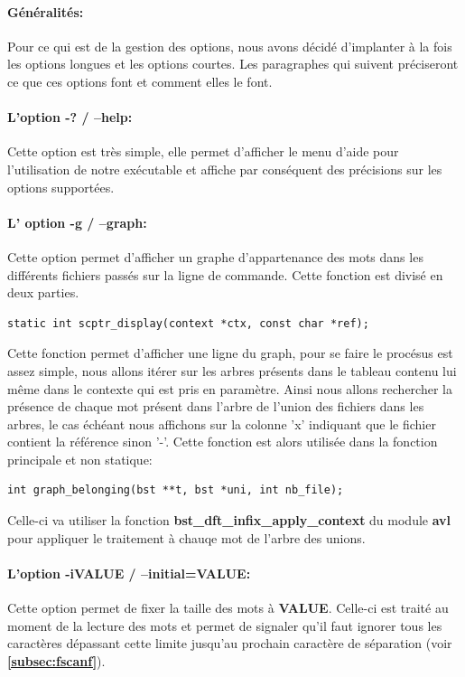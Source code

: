\documentclass{article}
\begin{document}
\paragraph{Généralités:}
Pour ce qui est de la gestion des options, nous avons décidé d'implanter à la fois les options longues et les options courtes.
Les paragraphes qui suivent préciseront ce que ces options font et comment elles le font.

\paragraph{L'option -? / --help:}
Cette option est très simple, elle permet d'afficher le menu d'aide pour l'utilisation 
de notre exécutable et affiche par conséquent des précisions sur les options supportées.

\paragraph{L' option -g / --graph:}
Cette option permet d'afficher un graphe d'appartenance des mots dans les différents 
fichiers passés sur la ligne de commande. Cette fonction est divisé en deux parties.

\begin{lstlisting}[style=Cstyle]
  static int scptr_display(context *ctx, const char *ref); 
\end{lstlisting}
Cette fonction permet d'afficher une ligne du graph, pour se faire le procésus est assez simple,
nous allons itérer sur les arbres présents dans le tableau contenu lui même dans le contexte qui est pris en paramètre.
Ainsi nous allons rechercher la présence de chaque mot présent dans l'arbre de l'union des fichiers dans les arbres, 
le cas échéant nous affichons sur la colonne 'x' indiquant que le fichier contient la référence sinon '-'.
Cette fonction est alors utilisée dans la fonction principale et non statique:
\begin{lstlisting}[style=Cstyle]
  int graph_belonging(bst **t, bst *uni, int nb_file); 
\end{lstlisting}
Celle-ci va utiliser la fonction \textbf{bst\_dft\_infix\_apply\_context} du module \textbf{avl} pour appliquer le traitement
à chauqe mot de l'arbre des unions.

\paragraph{L'option -iVALUE / --initial=VALUE:}
Cette option permet de fixer la taille des mots à \textbf{VALUE}.
Celle-ci est traité au moment de la lecture des mots et permet de signaler qu'il faut ignorer tous les caractères dépassant cette
limite jusqu'au prochain caractère de séparation (voir \textbf{\ref{subsec:fscanf}}).
\end{document}
